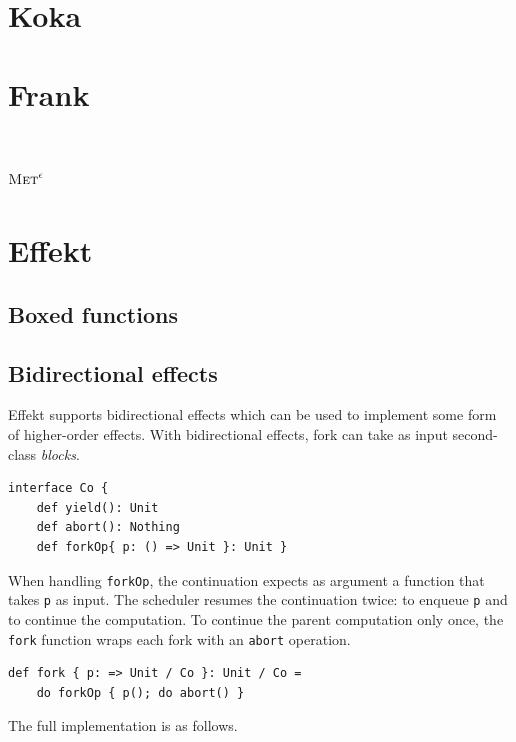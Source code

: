 \documentclass[sigplan, nonacm, natbib = false, review, screen]{acmart}
\newcommand{\Met}{\textsc{Met}\xspace}
\newcommand{\MetVar}{$\Met^\epsilon$\xspace}
\begin{document}
\printbibliography
\appendix

\section{Koka}

\section{Frank}

\section{\MetVar}


\section{Effekt}
\subsection{Boxed functions}

\subsection{Bidirectional effects}
Effekt supports bidirectional effects which can be used to implement
some form of higher-order effects.
%
With bidirectional effects, fork can take as input second-class
\emph{blocks}.
%
\begin{lstlisting}[style = effekt]
  interface Co {
    def yield(): Unit
    def abort(): Nothing
    def forkOp{ p: () => Unit }: Unit }
\end{lstlisting}
When handling \texttt{\small forkOp}, the continuation expects as argument a
function that takes \texttt{\small p} as input. The scheduler resumes the
continuation twice: to enqueue \texttt{\small p} and to continue the
computation.
To continue the parent computation only once,
the \texttt{\small fork} function wraps each fork with an \texttt{\small abort}
operation.
\begin{lstlisting}[style = effekt]
  def fork { p: => Unit / Co }: Unit / Co =
    do forkOp { p(); do abort() }
\end{lstlisting}

The full implementation is as follows.
\end{document}
